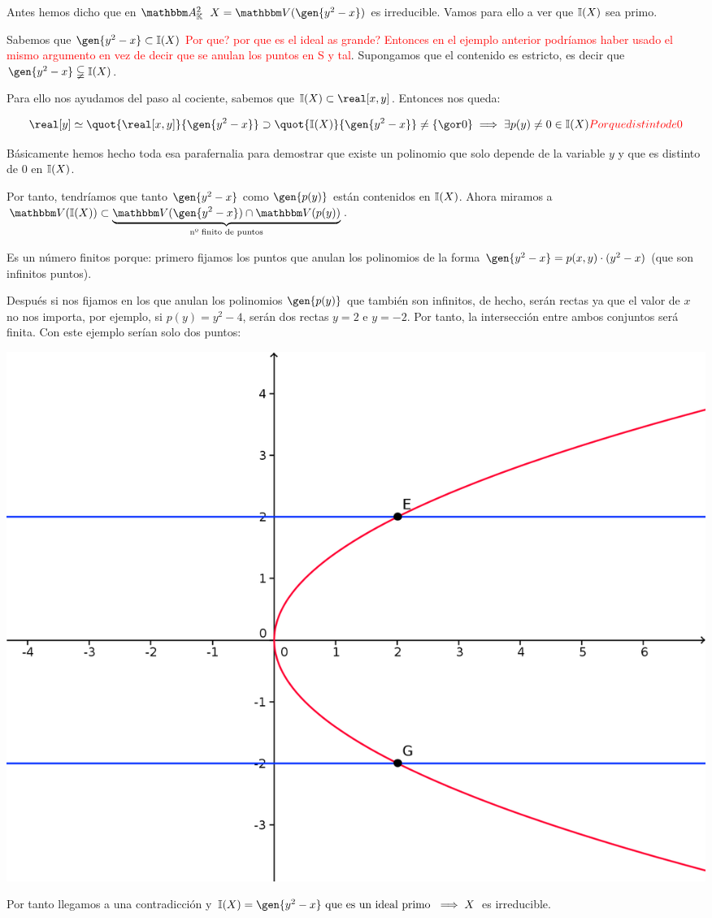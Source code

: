\begin{example}
	Antes hemos dicho que en $\A^2_{\K}$ $X=\V(\gen{y^2-x})$ es irreducible. Vamos para ello a ver que $\mathbb{I}(X)$ sea primo. 
	
	Sabemos que $\gen{y^2-x} \subset \I(X)$ \textcolor{red}{Por que? por que es el ideal as grande? Entonces en el ejemplo anterior podríamos haber usado el mismo argumento en vez de decir que se anulan los puntos en S y tal}. Supongamos que el contenido es estricto, es decir que $\gen{y^2-x} \subsetneqq \I(X)$.
	
	Para ello nos ayudamos del paso al cociente, sabemos que $\I(X) \subset \real[x,y]$. Entonces nos queda:
	
	$$ \real[y] \simeq \quot{\real[x,y]}{\gen{y^2-x}} \supset \quot{\I(X)}{\gen{y^2-x}}  \neq \{\cls{0}\} \implies \exists p(y) \neq 0 \in \I(X) \textcolor{red}{Por que distinto de 0}$$
	
	Básicamente hemos hecho toda esa parafernalia para demostrar que existe un polinomio que solo depende de la variable $y$ y que es distinto de 0 en $\mathbb{I}(X)$.
	
	Por tanto, tendríamos que tanto $\gen{y^2-x}$ como $\gen{p(y)}$ están contenidos en $\mathbb{I}(X)$. Ahora miramos a $\V(\I(X)) \subset \underbrace{\V(\gen{y^2-x}) \cap \V(p(y))}_{\text{nº finito de puntos}}$.
	
	Es un número finitos porque: primero fijamos los puntos que anulan los polinomios de la forma $\gen{y^2-x}=p(x,y)\cdot(y^2-x)$ (que son infinitos puntos).
	
	Después si nos fijamos en los que anulan los polinomios $\gen{p(y)}$ que también son infinitos, de hecho, serán rectas ya que el valor de $x$ no nos importa, por ejemplo, si $p(y)=y^2-4$, serán dos rectas $y=2$ e $y=-2$. Por tanto, la intersección entre ambos conjuntos será finita. Con este ejemplo serían solo dos puntos:
	
	\begin{center}
		\includegraphics[scale=0.45]{img/parabola.png}
	\end{center}
	
	Por tanto  llegamos a una contradicción y $\I(X)=\gen{y^2-x} \text{ que es un ideal primo }\implies X$ es irreducible.
\end{example}

